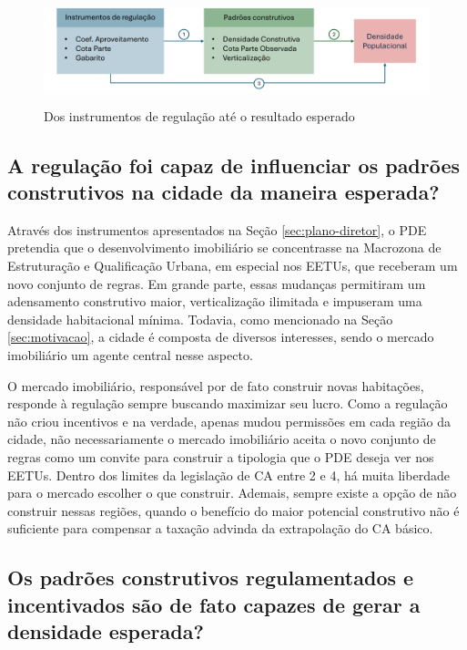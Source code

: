 \begin{figure}[h]
    \caption{Dos instrumentos de regulação até o resultado esperado}
    \includegraphics[width = \linewidth]{figuras/desenho_proposta.pdf}
    \label{fig:diagrama}
\end{figure}

\subsection*{A regulação foi capaz de influenciar os padrões construtivos na cidade da maneira esperada?} 

Através dos instrumentos apresentados na Seção \ref{sec:plano-diretor}, o PDE pretendia que o desenvolvimento imobiliário se concentrasse na Macrozona de Estruturação e Qualificação Urbana, em especial nos EETUs, que receberam um novo conjunto de regras. Em grande parte, essas mudanças permitiram um adensamento construtivo maior, verticalização ilimitada e impuseram uma densidade habitacional mínima. Todavia, como mencionado na Seção \ref{sec:motivacao}, a cidade é composta de diversos interesses, sendo o mercado imobiliário um agente central nesse aspecto. 

O mercado imobiliário, responsável por de fato construir novas habitações, responde à regulação sempre buscando maximizar seu lucro. Como a regulação não criou incentivos e na verdade, apenas mudou permissões em cada região da cidade, não necessariamente o mercado imobiliário aceita o novo conjunto de regras como um convite para construir a tipologia que o PDE deseja ver nos EETUs. Dentro dos limites da legislação de CA entre 2 e 4, há muita liberdade para o mercado escolher o que construir. Ademais, sempre existe a opção de não construir nessas regiões, quando o benefício do maior potencial construtivo não é suficiente para compensar a taxação advinda da extrapolação do CA básico. 

\subsection*{Os padrões construtivos regulamentados e incentivados são de fato capazes de gerar a densidade esperada?} 

